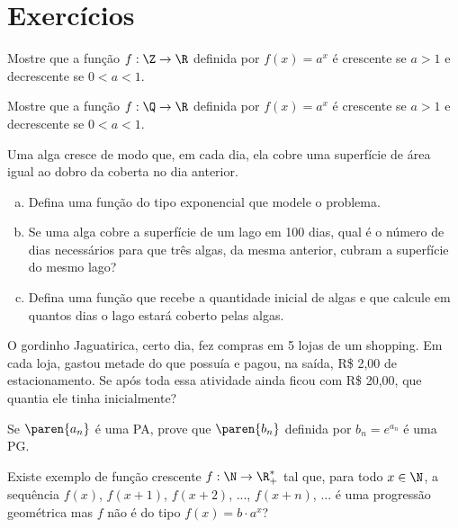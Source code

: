 \section{Exercícios}

\begin{exercise}
    Mostre que a função $f: \Z \to \R$ definida por $f(x)=a^x$ é
crescente se $a>1$ e decrescente se $0<a<1$.
\end{exercise}

\begin{exercise}
    Mostre que a função $f: \Q \to \R$ definida por $f(x)=a^x$ é
crescente se $a>1$ e decrescente se $0<a<1$.
\end{exercise}

\begin{exercise}
Uma alga cresce de modo que, em cada dia, ela cobre uma superfície de área
igual ao dobro da coberta no dia anterior.
%
\begin{enumerate}[a)]
  \item Defina uma função do tipo exponencial que modele o problema.
  \item Se uma alga cobre a superfície de um lago em 100 dias, 
  qual é o número de dias necessários para que três algas, da 
  mesma anterior, cubram a superfície do mesmo lago?
  \item Defina uma função que recebe a quantidade inicial de algas e que calcule
  em quantos dias o lago estará coberto pelas algas.
\end{enumerate}
\end{exercise}

\begin{exercise}
    O gordinho Jaguatirica, certo dia, fez compras em 5 lojas de um
shopping. Em cada loja, gastou metade do que possuía e pagou, na
saída, R\$ 2{,}00 de estacionamento. Se após toda essa atividade
ainda ficou com R\$ 20{,}00, que quantia ele tinha inicialmente?
\end{exercise}

\begin{exercise}
    Se $\paren{a_n}$ é uma PA, prove que $\paren{ b_n}$ definida por
$b_n = e^{a_n}$ é uma PG.
\end{exercise}

\begin{exercise}
    Existe exemplo de função crescente $f : \N \to \R_+^\ast$ tal
que, para todo $x \in \N$, a sequência $f(x)$, $f(x+1)$, $f(x+2)$,
..., $f(x+n)$, ... é uma progressão geométrica mas $f$ não é do tipo
$f(x) = b \cdot a^x$?
\end{exercise}

